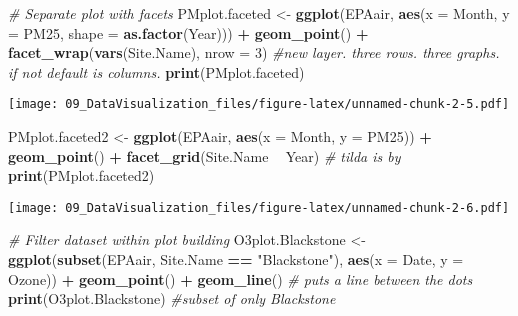 \documentclass[]{article}
\newenvironment{Shaded}{\begin{snugshade}}{\end{snugshade}}
\newcommand{\KeywordTok}[1]{\textcolor[rgb]{0.13,0.29,0.53}{\textbf{#1}}}
\newcommand{\DataTypeTok}[1]{\textcolor[rgb]{0.13,0.29,0.53}{#1}}
\newcommand{\DecValTok}[1]{\textcolor[rgb]{0.00,0.00,0.81}{#1}}
\newcommand{\StringTok}[1]{\textcolor[rgb]{0.31,0.60,0.02}{#1}}
\newcommand{\CommentTok}[1]{\textcolor[rgb]{0.56,0.35,0.01}{\textit{#1}}}
\newcommand{\OperatorTok}[1]{\textcolor[rgb]{0.81,0.36,0.00}{\textbf{#1}}}
\newcommand{\NormalTok}[1]{#1}
\begin{document}
\begin{Shaded}
\begin{Highlighting}[]
\CommentTok{# Separate plot with facets}
\NormalTok{PMplot.faceted <-}
\StringTok{  }\KeywordTok{ggplot}\NormalTok{(EPAair, }\KeywordTok{aes}\NormalTok{(}\DataTypeTok{x =}\NormalTok{ Month, }\DataTypeTok{y =}\NormalTok{ PM25, }\DataTypeTok{shape =} \KeywordTok{as.factor}\NormalTok{(Year))) }\OperatorTok{+}
\StringTok{  }\KeywordTok{geom_point}\NormalTok{() }\OperatorTok{+}
\StringTok{  }\KeywordTok{facet_wrap}\NormalTok{(}\KeywordTok{vars}\NormalTok{(Site.Name), }\DataTypeTok{nrow =} \DecValTok{3}\NormalTok{) }\CommentTok{#new layer. three rows. three graphs. if not default is columns.}
\KeywordTok{print}\NormalTok{(PMplot.faceted)}
\end{Highlighting}
\end{Shaded}

\texttt{[image: 09\_DataVisualization\_files/figure-latex/unnamed-chunk-2-5.pdf]}

\begin{Shaded}
\begin{Highlighting}[]
\NormalTok{PMplot.faceted2 <-}
\StringTok{  }\KeywordTok{ggplot}\NormalTok{(EPAair, }\KeywordTok{aes}\NormalTok{(}\DataTypeTok{x =}\NormalTok{ Month, }\DataTypeTok{y =}\NormalTok{ PM25)) }\OperatorTok{+}
\StringTok{  }\KeywordTok{geom_point}\NormalTok{() }\OperatorTok{+}
\StringTok{  }\KeywordTok{facet_grid}\NormalTok{(Site.Name }\OperatorTok{~}\StringTok{ }\NormalTok{Year) }\CommentTok{# tilda is by}
\KeywordTok{print}\NormalTok{(PMplot.faceted2)}
\end{Highlighting}
\end{Shaded}

\texttt{[image: 09\_DataVisualization\_files/figure-latex/unnamed-chunk-2-6.pdf]}

\begin{Shaded}
\begin{Highlighting}[]
\CommentTok{# Filter dataset within plot building}
\NormalTok{O3plot.Blackstone <-}\StringTok{ }
\StringTok{  }\KeywordTok{ggplot}\NormalTok{(}\KeywordTok{subset}\NormalTok{(EPAair, Site.Name }\OperatorTok{==}\StringTok{ "Blackstone"}\NormalTok{), }\KeywordTok{aes}\NormalTok{(}\DataTypeTok{x =}\NormalTok{ Date, }\DataTypeTok{y =}\NormalTok{ Ozone)) }\OperatorTok{+}\StringTok{ }
\StringTok{  }\KeywordTok{geom_point}\NormalTok{() }\OperatorTok{+}
\StringTok{  }\KeywordTok{geom_line}\NormalTok{() }\CommentTok{# puts a line between the dots}
\KeywordTok{print}\NormalTok{(O3plot.Blackstone) }\CommentTok{#subset of only Blackstone}
\end{Highlighting}
\end{Shaded}
\end{document}
